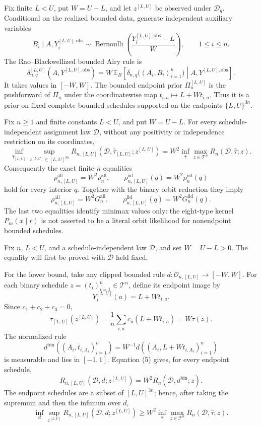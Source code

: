 Fix finite \(L<U\), put \(W=U-L\), and let \(z^{[L,U]}\) be observed under \(\mathcal D_q\).  Conditional on the realized bounded data, generate independent auxiliary variables
\[
B_i\mid A,Y_i^{[L,U],\mathrm{obs}}
\sim\operatorname{Bernoulli}\left(
\frac{Y_i^{[L,U],\mathrm{obs}}-L}{W}\right),\qquad 1\leq i\leq n.
\]
The Rao--Blackwellized bounded Airy rule is
\[
\delta_{n,q}^{[L,U]}(A,Y^{[L,U],\mathrm{obs}})
=W\,\mathbb E_B\left[
\delta_{n,q}\bigl((A_i,B_i)_{i=1}^n\bigr)
\mathrel{}\middle|\mathrel{} A,Y^{[L,U],\mathrm{obs}}
\right].
\]
It takes values in \([-W,W]\).  The bounded endpoint prior
\(\Pi_n^{[L,U]}\) is the pushforward of \(\Pi_n\) under the coordinatewise map
\(t_{i,a}\mapsto L+Wt_{i,a}\).  Thus it is a prior on fixed complete bounded schedules supported on the endpoints \(\{L,U\}^{3n}\).

Fix \(n\geq1\) and finite constants \(L<U\), and put \(W=U-L\).  For every schedule-independent assignment law \(\mathcal D\), without any positivity or independence restriction on its coordinates,
\[
\inf_{\widehat\tau_{[L,U]}}
\sup_{z^{[L,U]}\in[L,U]^{3n}}
R_{n,[L,U]}(\mathcal D,\widehat\tau_{[L,U]};z^{[L,U]})
=W^2\inf_{\widehat\tau}
\max_{z\in\mathcal T^n}R_n(\mathcal D,\widehat\tau;z).
\]
Consequently the exact finite-\(n\) equalities
\[
\rho_{n,[L,U]}^{\mathrm{all}}=W^2\rho_n^{\mathrm{all}},
\qquad
\rho_{n,[L,U]}^{\mathrm{iid}}(q)=W^2\rho_n^{\mathrm{iid}}(q)
\]
hold for every interior \(q\).  Together with the binary orbit reduction they imply
\[
\rho_{n,[L,U]}^{\mathrm{all}}=W^2G_n^{\mathrm{all}},
\qquad
\rho_{n,[L,U]}^{\mathrm{iid}}(q)=W^2G_n^{\mathrm{iid}}(q).
\]
The last two equalities identify minimax values only: the eight-type kernel \(P_m(x\mid r)\) is not asserted to be a literal orbit likelihood for nonendpoint bounded schedules.

Fix \(n\), \(L<U\), and a schedule-independent law \(\mathcal D\), and set \(W=U-L>0\).  The equality will first be proved with \(\mathcal D\) held fixed.

For the lower bound, take any clipped bounded rule \(d:\mathcal O_{n,[L,U]}\to[-W,W]\).  For each binary schedule \(z=(t_i)_{i=1}^n\in\mathcal T^n\), define its endpoint image by
\[
Y_i^{[L,U]}(a)=L+Wt_{i,a}.
\]
Since \(c_1+c_2+c_3=0\),
\[
\tau_{[L,U]}(z^{[L,U]})
=\frac1n\sum_{i,a}c_a(L+Wt_{i,a})
=W\tau(z).
\tag{5}
\]
The normalized rule
\[
d^{\mathrm{bin}}((A_i,t_{i,A_i})_{i=1}^n)
=W^{-1}d((A_i,L+Wt_{i,A_i})_{i=1}^n)
\]
is measurable and lies in \([-1,1]\).  Equation (5) gives, for every endpoint schedule,
\[
R_{n,[L,U]}(\mathcal D,d;z^{[L,U]})
=W^2R_n(\mathcal D,d^{\mathrm{bin}};z).
\]
The endpoint schedules are a subset of \([L,U]^{3n}\); hence, after taking the supremum and then the infimum over \(d\),
\[
\inf_d\sup_{z^{[L,U]}}R_{n,[L,U]}(\mathcal D,d;z^{[L,U]})
\geq W^2\inf_{\widehat\tau}\max_{z\in\mathcal T^n}
R_n(\mathcal D,\widehat\tau;z).
\tag{6}
\]

